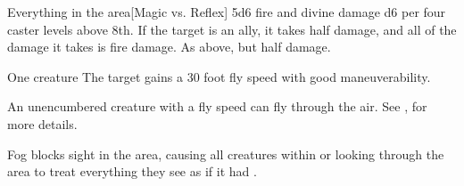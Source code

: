 \begin{spellheader}
    \spellrng{\rngclose}
\end{spellheader}
\begin{spelleffects}
    \begin{spelltarget}{Everything in the area}[Magic vs. Reflex]
        \spellsuccess 5d6 fire and divine damage \add d6 per four caster levels above 8th. If the target is an ally, it takes half damage, and all of the damage it takes is fire damage.
        \spellfailure As above, but half damage.
    \end{spelltarget}
\end{spelleffects}
\begin{spellfooter}
    \spellnotes \destructivespellnotes

    \firespellnotes
\end{spellfooter}

\begin{spellheader}
    \spellrng{\rngtouch}
    \spelldur{\durshort}
\end{spellheader}
\begin{spelleffects}
    \begin{spelltarget}{One creature}
        \spelleffect The target gains a 30 foot fly speed with good maneuverability.
    \end{spelltarget}
\end{spelleffects}
\begin{spellfooter}
    \spellnotes An unencumbered creature with a fly speed can fly through the air. See , for more details.

\end{spellfooter}%

\begin{spellheader}
    \spelldur{\durshort}
\end{spellheader}
\begin{spelleffects}
    \spelleffect Fog blocks sight in the area, causing all creatures within or looking through the area to treat everything they see as if it had \concealment.
\end{spelleffects}
\begin{spellfooter}
    \spellnotes \fogspellnotes \fogwindspellnotes
\end{spellfooter}

